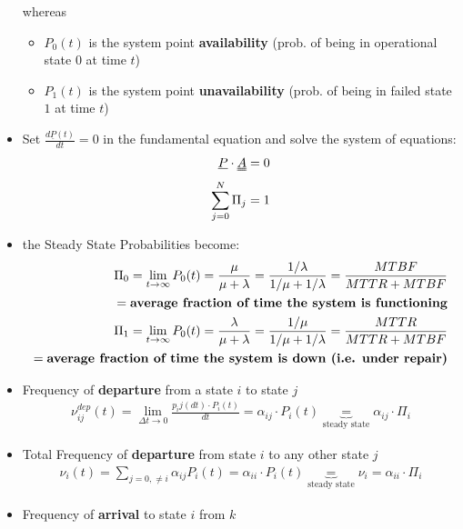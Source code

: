 \documentclass[8pt, landscape, fleqn]{scrartcl}
\begin{document}
\begin{multicols*}{3}
\begin{itemize}
\begin{equation}
    \end{equation}
    whereas \begin{itemize}
        \item $P_0(t)$ is the system point \textbf{availability} (prob. of being in operational state $0$ at time $t$)
        \item $P_1(t)$ is the system point \textbf{unavailability} (prob. of being in failed state $1$ at time $t$)
    \end{itemize}
    \item Set $\frac{d\underline{P}(t)}{dt} = 0$ in the fundamental equation and solve the system of equations:
    \begin{align}
        \underline{P} \cdot \uuline{A} = 0 \\
        \sum_{j=0}^N \Pi_j = 1
    \end{align}
    \item the Steady State Probabilities become:
    \begin{align}
        \Pi_0 = \lim_{t\rightarrow \infty} P_0(t) = \frac{\mu}{\mu+\lambda} = \frac{1/ \lambda}{1 / \mu + 1/ \lambda} = \frac{MTBF}{MTTR + MTBF} \\
        = \text{\textbf{average fraction of time the system is functioning}} \\
        \Pi_1 = \lim_{t\rightarrow \infty} P_0(t) = \frac{\lambda}{\mu+\lambda} = \frac{1/ \mu}{1 / \mu + 1/ \lambda} = \frac{MTTR}{MTTR + MTBF} \\
        = \text{\textbf{average fraction of time the system is down (i.e. under repair)}}
    \end{align}
    \item Frequency of \textbf{departure} from a state $i$ to state $j$
    \begin{align}
        \nu_{ij}^{dep}(t) = \lim_{\Delta t \rightarrow 0} \frac{p_ij(dt)\cdot P_i(t)}{dt} = \alpha_{ij}\cdot P_i(t) \underbrace{=}_{\text{steady state}} \alpha_{ij} \cdot \Pi_i
    \end{align} 
    \item Total Frequency of \textbf{departure} from state $i$ to any other state $j$
    \begin{align}
        \nu_{i} (t) = \sum_{j=0,\neq i}\alpha_{ij}P_i(t) = \alpha_{ii}\cdot P_i(t)  \underbrace{=}_{\text{steady state}} \nu_i = \alpha_{ii} \cdot \Pi_i
    \end{align}
    \item Frequency of \textbf{arrival} to state $i$ from $k$
    \begin{align}

\end{align}
\end{itemize}
\end{multicols*}
\end{document}
